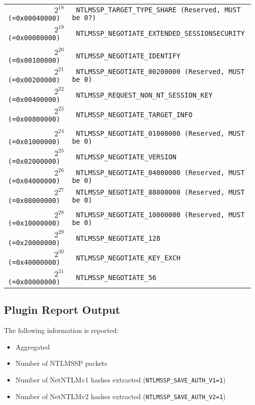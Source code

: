 \documentclass[documentation]{subfiles}
\begin{document}
\begin{longtable}{>{\tt}r>{\tt}l}
    $2^{18}$ (=0x00040000) & NTLMSSP\_TARGET\_TYPE\_SHARE \textnormal{(Reserved, MUST be 0?)}\\
    $2^{19}$ (=0x00080000) & NTLMSSP\_NEGOTIATE\_EXTENDED\_SESSIONSECURITY\\
    \\
    $2^{20}$ (=0x00100000) & NTLMSSP\_NEGOTIATE\_IDENTIFY\\
    $2^{21}$ (=0x00200000) & NTLMSSP\_NEGOTIATE\_00200000 \textnormal{(Reserved, MUST be 0)}\\
    $2^{22}$ (=0x00400000) & NTLMSSP\_REQUEST\_NON\_NT\_SESSION\_KEY\\
    $2^{23}$ (=0x00800000) & NTLMSSP\_NEGOTIATE\_TARGET\_INFO\\
    \\
    $2^{24}$ (=0x01000000) & NTLMSSP\_NEGOTIATE\_01000000 \textnormal{(Reserved, MUST be 0)}\\
    $2^{25}$ (=0x02000000) & NTLMSSP\_NEGOTIATE\_VERSION\\
    $2^{26}$ (=0x04000000) & NTLMSSP\_NEGOTIATE\_04000000 \textnormal{(Reserved, MUST be 0)}\\
    $2^{27}$ (=0x08000000) & NTLMSSP\_NEGOTIATE\_08000000 \textnormal{(Reserved, MUST be 0)}\\
    \\
    $2^{28}$ (=0x10000000) & NTLMSSP\_NEGOTIATE\_10000000 \textnormal{(Reserved, MUST be 0)}\\
    $2^{29}$ (=0x20000000) & NTLMSSP\_NEGOTIATE\_128\\
    $2^{30}$ (=0x40000000) & NTLMSSP\_NEGOTIATE\_KEY\_EXCH\\
    $2^{31}$ (=0x80000000) & NTLMSSP\_NEGOTIATE\_56\\
    \bottomrule
\end{longtable}

\subsection{Plugin Report Output}
The following information is reported:
\begin{itemize}
    \item Aggregated {\tt{}}
    \item Number of NTLMSSP packets
    \item Number of NetNTLMv1 hashes extracted ({\tt NTLMSSP\_SAVE\_AUTH\_V1=1})
    \item Number of NetNTLMv2 hashes extracted ({\tt NTLMSSP\_SAVE\_AUTH\_V2=1})
\end{itemize}
\end{document}
